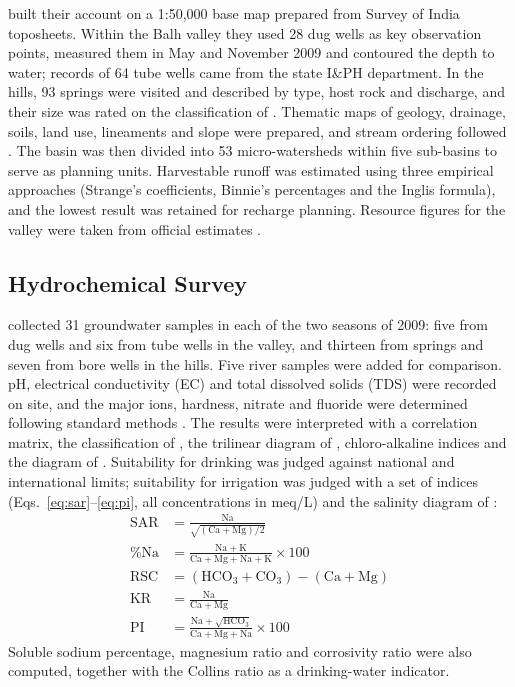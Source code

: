 \documentclass[10pt,a4paper,twocolumn]{article}
\begin{document}
\citet{pophare2015} built their account on a 1:50,000 base map prepared from Survey of India
toposheets. Within the Balh valley they used 28 dug wells as key observation points, measured
them in May and November 2009 and contoured the depth to water; records of 64 tube wells came
from the state I\&PH department. In the hills, 93 springs were
visited and described by type, host rock and discharge, and their size was rated on the
classification of \citet{meinzer1923}. Thematic maps of geology, drainage, soils, land use,
lineaments and slope were prepared, and stream ordering followed \citet{strahler1957}. The
basin was then divided into 53 micro-watersheds within five sub-basins to serve as planning
units. Harvestable runoff was estimated using three empirical approaches (Strange's
coefficients, Binnie's percentages and the Inglis formula), and the lowest result was retained
for recharge planning. Resource figures for the valley were taken from official estimates
\citep{cgwb2006}.

\subsection{Hydrochemical Survey}

\citet{pophare2018} collected 31 groundwater samples in each of the two seasons of 2009: five
from dug wells and six from tube wells in the valley, and thirteen from springs and seven from
bore wells in the hills. Five river samples were added for comparison. pH, electrical
conductivity (EC) and total dissolved solids (TDS) were recorded on site, and the major
ions, hardness, nitrate and fluoride were determined following standard methods
\citep{apha1998}. The results were interpreted with a correlation matrix, the classification of
\citet{schoeller1967}, the trilinear diagram of \citet{piper1944}, chloro-alkaline indices and
the diagram of \citet{gibbs1970}. Suitability for drinking was judged against national and
international limits; suitability for irrigation was judged with a set of indices
(Eqs.~\ref{eq:sar}--\ref{eq:pi}, all concentrations in meq/L) and the salinity diagram of
\citet{richards1954}:
\begin{align}
\mathrm{SAR} &= \frac{\mathrm{Na}}{\sqrt{(\mathrm{Ca}+\mathrm{Mg})/2}} \label{eq:sar}\\[2pt]
\%\mathrm{Na} &= \frac{\mathrm{Na}+\mathrm{K}}{\mathrm{Ca}+\mathrm{Mg}+\mathrm{Na}+\mathrm{K}}\times 100 \label{eq:pna}\\[2pt]
\mathrm{RSC} &= (\mathrm{HCO_3}+\mathrm{CO_3})-(\mathrm{Ca}+\mathrm{Mg}) \label{eq:rsc}\\[2pt]
\mathrm{KR} &= \frac{\mathrm{Na}}{\mathrm{Ca}+\mathrm{Mg}} \label{eq:kr}\\[2pt]
\mathrm{PI} &= \frac{\mathrm{Na}+\sqrt{\mathrm{HCO_3}}}{\mathrm{Ca}+\mathrm{Mg}+\mathrm{Na}}\times 100 \label{eq:pi}
\end{align}
Soluble sodium percentage, magnesium ratio and corrosivity ratio were also computed, together
with the Collins ratio as a drinking-water indicator.
\end{document}
